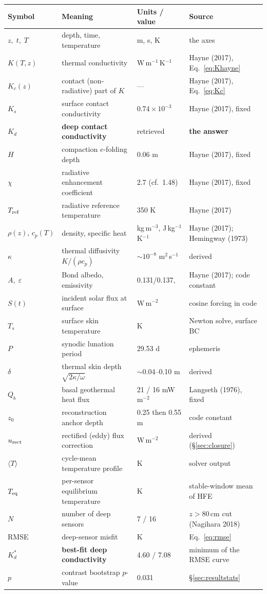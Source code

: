 \documentclass[11pt]{report}
\newcommand{\Tm}{\langle T\rangle}
\begin{document}
\begin{center}\footnotesize
\begin{tabular}{@{}p{1.7cm}p{5.4cm}p{3.0cm}p{4.8cm}@{}}
\toprule
Symbol & Meaning & Units / value & Source \\
\midrule
$z,\;t,\;T$ & depth, time, temperature & m, s, K & the axes \\
$K(T,z)$ & thermal conductivity & W\,m$^{-1}$\,K$^{-1}$ & Hayne (2017), Eq.~\eqref{eq:Khayne} \\
$K_c(z)$ & contact (non-radiative) part of $K$ & --- & Hayne (2017), Eq.~\eqref{eq:Kc} \\
$K_s$ & surface contact conductivity & $0.74\times10^{-3}$ & Hayne (2017), fixed \\
$\boxed{K_d}$ & \textbf{deep contact conductivity} & retrieved & \textbf{the answer} \\
$H$ & compaction $e$-folding depth & 0.06 m & Hayne (2017), fixed \\
$\chi$ & radiative enhancement coefficient & 2.7 (cf.\ 1.48) & Hayne (2017), fixed \\
$T_{\rm ref}$ & radiative reference temperature & 350 K & Hayne (2017) \\
$\rho(z),\,c_p(T)$ & density, specific heat & kg\,m$^{-3}$, J\,kg$^{-1}$K$^{-1}$ & Hayne (2017); Hemingway (1973) \\
$\kappa$ & thermal diffusivity $K/(\rho c_p)$ & $\sim10^{-8}$ m$^2$\,s$^{-1}$ & derived \\
$A,\;\varepsilon$ & Bond albedo, emissivity & 0.131/0.137,\; 0.95 & Hayne (2017); code constant \\
$S(t)$ & incident solar flux at surface & W\,m$^{-2}$ & cosine forcing in code \\
$T_s$ & surface skin temperature & K & Newton solve, surface BC \\
$P$ & synodic lunation period & 29.53 d & ephemeris \\
$\delta$ & thermal skin depth $\sqrt{2\kappa/\omega}$ & $\sim$0.04--0.10 m & derived \\
$Q_b$ & basal geothermal heat flux & 21 / 16 mW\,m$^{-2}$ & Langseth (1976), fixed \\
$z_0$ & reconstruction anchor depth & 0.25 then 0.55 m & code constant \\
$u_{\rm rect}$ & rectified (eddy) flux correction & W\,m$^{-2}$ & derived (\S\ref{sec:closure}) \\
$\Tm$ & cycle-mean temperature profile & K & solver output \\
$T_{\rm eq}$ & per-sensor equilibrium temperature & K & stable-window mean of HFE \\
$N$ & number of deep sensors & 7 / 16 & $z>80$\,cm cut (Nagihara 2018) \\
RMSE & deep-sensor misfit & K & Eq.~\eqref{eq:rmse} \\
$\boxed{K_d^*}$ & \textbf{best-fit deep conductivity} & 4.60 / 7.08 & minimum of the RMSE curve \\
$p$ & contrast bootstrap $p$-value & 0.031 & \S\ref{sec:resultstats} \\
\bottomrule
\end{tabular}
\end{center}
\end{document}
